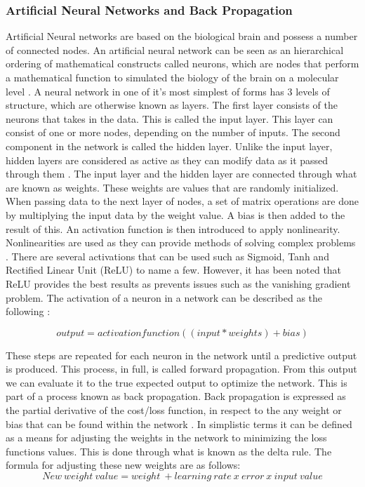 \subsubsection{Artificial Neural Networks and Back Propagation}
Artificial Neural networks are based on the biological brain and possess a number of connected nodes. An artificial neural network can be seen as an hierarchical ordering of mathematical constructs called neurons, which are nodes that perform a mathematical function to simulated the biology of the brain on a molecular level \citep{muir}.  A neural network in one of it's most simplest of forms has 3 levels of structure, which are otherwise known as layers. The first layer consists of the neurons that takes in the data. This is called the input layer. This layer can consist of one or more nodes, depending on the number of inputs. The second component in the network is called the hidden layer. Unlike the input layer, hidden layers are considered as active as they can modify data as it passed through them \citep{smith_2011}. The input layer and the hidden layer are connected through what are known as weights. These weights are values that are randomly initialized. When passing data to the next layer of nodes, a set of matrix operations are done by multiplying the input data by the weight value. A bias is then added to the result of this. An activation function is then introduced to apply nonlinearity. Nonlinearities are used as they can provide methods of solving complex problems \citep{raschka_2016}. There are several activations that can be used such as Sigmoid, Tanh and Rectified Linear Unit (ReLU) to name a few. However, it has been noted that ReLU provides the best results as prevents issues such as the vanishing gradient problem. The activation of a neuron in a network can be described as the following \citep{collis_2017}:

\begin{equation}\label{eq:act}
output = activation function((input * weights) + bias)
\end{equation}

These steps are repeated for each neuron in the network until a predictive output is produced. This process, in full, is called forward propagation. From this output we can evaluate it to the true expected output to optimize the network. This is part of a process known as back propagation. Back propagation is expressed as the partial derivative of the cost/loss function, in respect to the any weight or bias that can be found within the network \citep{nielsen_2015}. In simplistic terms it can be defined as a means for adjusting the weights in the network to minimizing the loss functions values. This is done through what is known as the delta rule. The formula for adjusting these new weights are as follows:
\begin{equation}\label{eq:act}
New\ weight\ value = weight\ + learning\ rate\ x\ error\ x\ input\ value
\end{equation}

